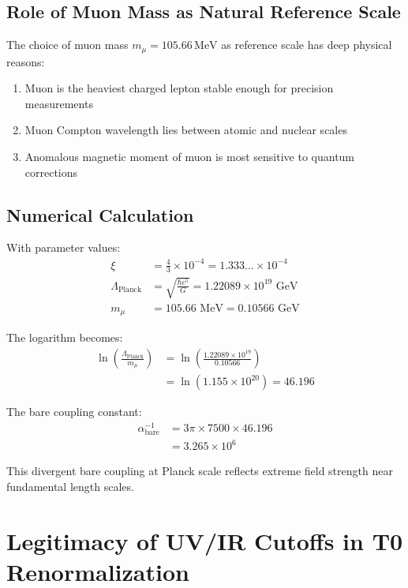 \documentclass[12pt,a4paper]{article}
\theoremstyle{definition}
\begin{document}
	\subsection{Role of Muon Mass as Natural Reference Scale}
	
	The choice of muon mass $m_{\mu} = 105.66\,\text{MeV}$ as reference scale has deep physical reasons:
	
	\begin{enumerate}
		\item Muon is the heaviest charged lepton stable enough for precision measurements
		\item Muon Compton wavelength lies between atomic and nuclear scales
		\item Anomalous magnetic moment of muon is most sensitive to quantum corrections
	\end{enumerate}
	
	\subsection{Numerical Calculation}
	
	With parameter values:
	\begin{align}
		\xi &= \frac{4}{3} \times 10^{-4} = 1.333\ldots \times 10^{-4}\\
		\Lambda_{\text{Planck}} &= \sqrt{\frac{\hbar c^5}{G}} = 1.22089 \times 10^{19} \text{ GeV}\\
		m_{\mu} &= 105.66 \text{ MeV} = 0.10566 \text{ GeV}
	\end{align}
	
	The logarithm becomes:
	\begin{align}
		\ln\left(\frac{\Lambda_{\text{Planck}}}{m_{\mu}}\right) &= \ln\left(\frac{1.22089 \times 10^{19}}{0.10566}\right)\\
		&= \ln(1.155 \times 10^{20}) = 46.196
	\end{align}
	
	The bare coupling constant:
	\begin{align}
		\alpha_{\text{bare}}^{-1} &= 3\pi \times 7500 \times 46.196\\
		&= 3.265 \times 10^6
	\end{align}
	
	This divergent bare coupling at Planck scale reflects extreme field strength near fundamental length scales.
	
	\section{Legitimacy of UV/IR Cutoffs in T0 Renormalization}
	
\end{document}
